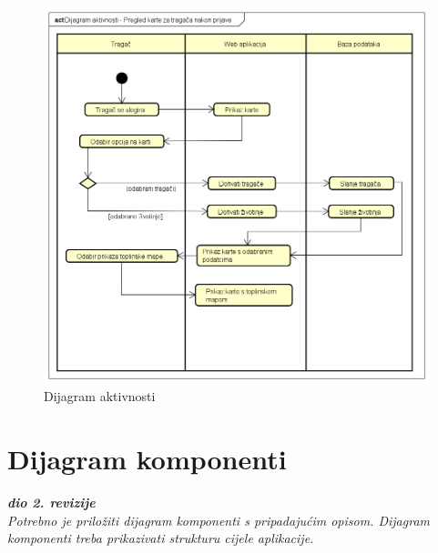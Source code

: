 			\begin{figure}[H]
				\includegraphics[scale=0.6]{slike/dijagram_aktivnosti.PNG} %
				\centering
				\caption{Dijagram aktivnosti}
				\label{fig:promjene}
			\end{figure}
			
			\eject
		\section{Dijagram komponenti}
		
			\textbf{\textit{dio 2. revizije}}\\
		
			 \textit{Potrebno je priložiti dijagram komponenti s pripadajućim opisom. Dijagram komponenti treba prikazivati strukturu cijele aplikacije.}